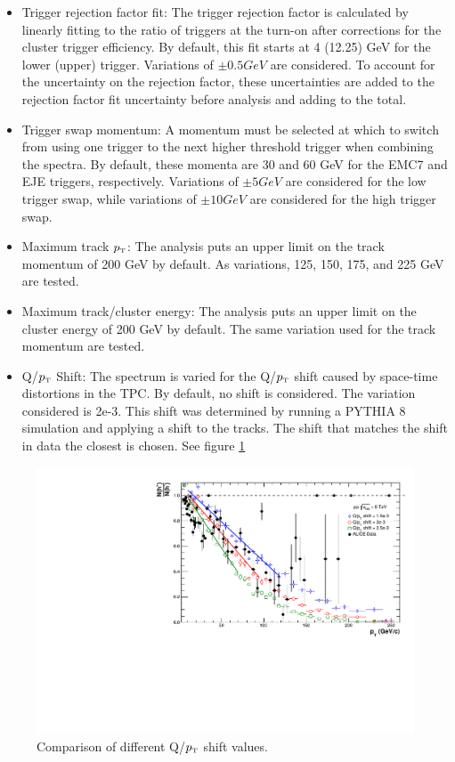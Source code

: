 \documentclass[ALICE]{ALICE_analysis_notes}
\newcommand{\pT}{$p_{\mbox{\tiny T}}$\xspace}
\begin{document}
\begin{itemize}
    \item Trigger rejection factor fit: The trigger rejection factor is calculated by linearly fitting to the ratio of triggers at the turn-on after corrections for the cluster trigger efficiency. By default, this fit starts at 4 (12.25) GeV for the lower (upper) trigger. Variations of $\pm 0.5 GeV$ are considered. To account for the uncertainty on the rejection factor, these uncertainties are added to the rejection factor fit uncertainty before analysis and adding to the total.

    \item Trigger swap momentum: A momentum must be selected at which to switch from using one trigger to the next higher threshold trigger when combining the spectra. By default, these momenta are 30 and 60 GeV for the EMC7 and EJE triggers, respectively. Variations of $\pm 5 GeV$ are considered for the low trigger swap, while variations of $\pm 10 GeV$ are considered for the high trigger swap.

    \item Maximum track \pT: The analysis puts an upper limit on the track momentum of 200 GeV by default. As variations, 125, 150, 175, and 225 GeV are tested.

    \item Maximum track/cluster energy: The analysis puts an upper limit on the cluster energy of 200 GeV by default. The same variation used for the track momentum are tested.

    \item Q/\pT Shift: The spectrum is varied for the Q/\pT shift caused by space-time distortions in the TPC. By default, no shift is considered. The variation considered is 2e-3. This shift was determined by running a PYTHIA 8 simulation and applying a shift to the tracks. The shift that matches the shift in data the closest is chosen. See figure \ref{fig:QoverPtShift}
\end{itemize}

\begin{figure}
    \centering
    \includegraphics[width=15cm]{figures/QoverPtShift/QPTComparison.pdf}
    \caption{Comparison of different Q/\pT shift values.}
    \label{fig:QoverPtShift}
\end{figure}
\end{document}
